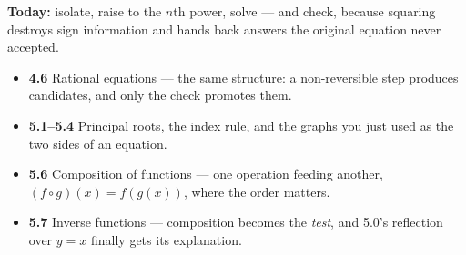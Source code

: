 \documentclass[aspectratio=169, 11pt]{beamer}
\begin{document}
\begin{frame}[t, plain]
  \textbf{Today:} isolate, raise to the $n$th power, solve --- and check, because squaring destroys
  sign information and hands back answers the original equation never accepted.\\[8pt]
  \begin{itemize}\setlength{\itemsep}{3pt}
    \item \textbf{4.6} Rational equations --- the same structure: a non-reversible step produces
          candidates, and only the check promotes them.
    \item \textbf{5.1--5.4} Principal roots, the index rule, and the graphs you just used as the two
          sides of an equation.
    \item \textbf{5.6} Composition of functions --- one operation feeding another, $(f\circ
          g)(x)=f(g(x))$, where the order matters.
    \item \textbf{5.7} Inverse functions --- composition becomes the \emph{test}, and 5.0's
          reflection over $y=x$ finally gets its explanation.
  \end{itemize}
\end{frame}
\end{document}

